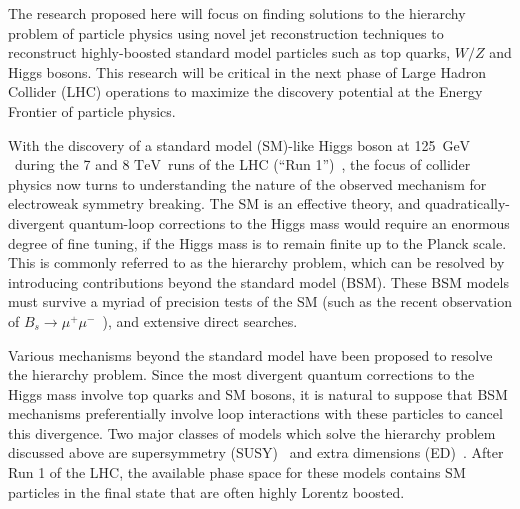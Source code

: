 \documentclass[12pt]{proposalnsf}
\newcommand{\TeV}{\ensuremath{\mathrm{TeV}}}
\newcommand{\GeVcc}{\ensuremath{\mathrm{GeV}}}
\begin{document}
The research proposed here will focus on finding solutions to the
hierarchy problem of particle physics using novel jet reconstruction
techniques to reconstruct highly-boosted standard model particles such
as top quarks, $W/Z$ and Higgs bosons. This research will be critical
in the next phase of Large Hadron Collider (LHC) operations to
maximize the discovery potential at the Energy Frontier of particle
physics. 

With the discovery of a 
standard model (SM)-like Higgs boson at
125~\GeVcc\ during the 7 and 8 \TeV\ runs of the LHC 
(``Run 1'')~\cite{higgs_atlas,higgs_cms}, 
the focus of collider physics now turns to understanding the nature of
the observed mechanism for electroweak symmetry breaking.
The SM is an effective theory, and quadratically-divergent
quantum-loop corrections to the Higgs
mass would require an enormous degree of fine tuning, if the Higgs
mass is to remain finite up to the Planck scale. This is commonly
referred to as the hierarchy problem, which can be resolved by
introducing contributions beyond the standard model (BSM). 
These BSM models must survive a myriad of precision tests of the SM
(such as the recent observation of $B_s\rightarrow
\mu^+\mu^-$~\cite{bsmumu_cms,bsmumu_lhcb}), and extensive direct
searches. 

Various mechanisms beyond the standard model
have been proposed to resolve the hierarchy problem.
Since the most divergent 
quantum corrections to the Higgs mass
involve top quarks and SM bosons, it is natural to suppose
that BSM mechanisms preferentially involve loop interactions with these
particles to cancel this divergence.
Two major classes of models which solve the hierarchy problem
discussed above are supersymmetry
(SUSY)~\cite{Gunion:1987qv,Feng:1999mn,Kitano:2006gv,Barbieri:2009ev,Horton:2009ed}
and extra dimensions (ED)~\cite{ed,rs1,rs2,rs_gluon_1}. 
After Run 1 of the LHC, the available phase space for these models
contains SM particles in the final state that are often highly
Lorentz boosted. 
\end{document}
